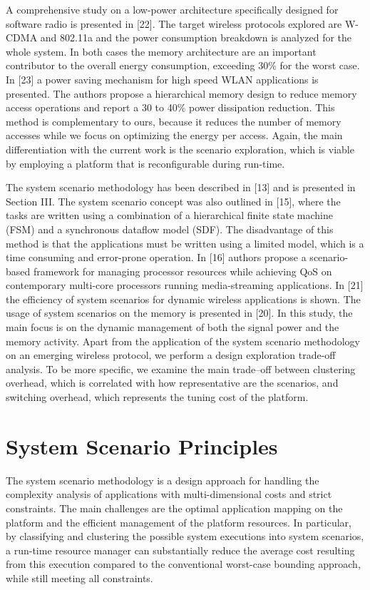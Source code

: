 A comprehensive study on a low-power architecture specifically designed for software radio is presented in [22]. The target wireless protocols explored are W-CDMA and 802.11a and the power consumption breakdown is analyzed for the whole system. In both cases the memory architecture are an important contributor to the overall energy consumption, exceeding 30\% for the worst case. In [23] a power saving mechanism for high speed WLAN applications is presented. The authors propose a hierarchical memory design to reduce memory access operations and report a 30 to 40\% power dissipation reduction. This method is complementary to ours, because it reduces the number of memory accesses while we focus on optimizing the energy per access. Again, the main differentiation with the current work is the scenario exploration, which is viable by employing a platform that is reconfigurable during run-time.

The system scenario methodology has been described in [13] and is presented in Section III. The system scenario concept was also outlined in [15], where the tasks are written using a combination of a hierarchical finite state machine (FSM) and a synchronous dataflow model (SDF). The disadvantage of this method is that the applications must be written using a limited model, which is a time consuming and error-prone operation. In [16] authors propose a scenario-based framework for managing processor resources while achieving QoS on contemporary multi-core processors running media-streaming applications. In [21] the efficiency of system scenarios for dynamic wireless applications is shown. The usage of system scenarios on the memory is presented in [20]. In this study, the main focus is on the dynamic management of both the signal power and the memory activity. Apart from the application of the system scenario methodology on an emerging wireless protocol, we perform a design exploration trade-off analysis. To be more specific, we examine the main trade–off between clustering overhead, which is correlated with how representative are the scenarios, and switching overhead, which represents the tuning cost of the platform.

\section{System Scenario Principles}

The system scenario methodology is a design approach for handling the complexity analysis of applications with multi-dimensional costs and strict constraints. The main challenges are the optimal application mapping on the platform and the efficient management of the platform resources. In particular, by classifying and clustering the possible system executions into system scenarios, a run-time resource manager can substantially reduce the average cost resulting from this execution compared to the conventional worst-case bounding approach, while still meeting all constraints.

